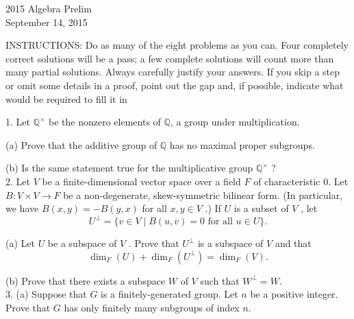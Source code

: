 \documentclass[11pt]{article}
\newcommand{\Q}{\mathbb{Q}}
\begin{document}
\begin{center}
\Large 2015 Algebra Prelim\\
\normalsize September 14, 2015
\end{center}
\vspace{1em}

INSTRUCTIONS: Do as many of the eight problems as you can. Four completely
correct solutions will be a pass; a few complete solutions will count more than many
partial solutions. Always carefully justify your answers. If you skip a step or omit
some details in a proof, point out the gap and, if possible, indicate what would be
required to fill it in\\
\vspace{1em}

1. Let $\Q^\times$
be the nonzero elements of $\Q$, a group under multiplication.

(a) Prove that the additive group of $\Q$ has no maximal proper subgroups.

(b) Is the same statement true for the multiplicative group $\Q^\times$ ?\\

2. Let $V$ be a finite-dimensional vector space over a field $F$ of characteristic 0.
Let $B : V \times V \to F$ be a non-degenerate, skew-symmetric bilinear form. (In particular, we
have $B(x, y) = −B(y, x)$ for all $x, y \in V$ .) If $U$ is a subset of $V$ , let\[
U^\perp = \{v\in V \mid B(u,v) = 0 \text{ for all } u\in U\}.
\]

(a) Let $U$ be a subspace of $V$ . Prove that $U^\perp$ is a subspace of $V$ and that \[\dim_F(U) + \dim_F(U^\perp) = \dim_F(V).\]

(b) Prove that there exists a subspace $W$ of $V$ such that $W^\perp = W$. \\

3. (a) Suppose that $G$ is a finitely-generated group. Let $n$ be a positive integer. Prove that
$G$ has only finitely many subgroups of index $n$.
\end{document}
